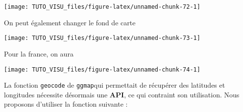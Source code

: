 \documentclass[]{article}
\newenvironment{Shaded}{\begin{snugshade}}{\end{snugshade}}
\newcommand{\DataTypeTok}[1]{\textcolor[rgb]{0.13,0.29,0.53}{#1}}
\newcommand{\DecValTok}[1]{\textcolor[rgb]{0.00,0.00,0.81}{#1}}
\newcommand{\KeywordTok}[1]{\textcolor[rgb]{0.13,0.29,0.53}{\textbf{#1}}}
\newcommand{\NormalTok}[1]{#1}
\newcommand{\OperatorTok}[1]{\textcolor[rgb]{0.81,0.36,0.00}{\textbf{#1}}}
\newcommand{\StringTok}[1]{\textcolor[rgb]{0.31,0.60,0.02}{#1}}
\theoremstyle{definition}
\theoremstyle{definition}
\theoremstyle{definition}
\theoremstyle{remark}
\begin{document}
\begin{center}\texttt{[image: TUTO\_VISU\_files/figure-latex/unnamed-chunk-72-1]} \end{center}

On peut également changer le fond de carte

\begin{Shaded}
\end{Shaded}

\begin{center}\texttt{[image: TUTO\_VISU\_files/figure-latex/unnamed-chunk-73-1]} \end{center}

Pour la france, on aura

\begin{Shaded}
\end{Shaded}

\begin{center}\texttt{[image: TUTO\_VISU\_files/figure-latex/unnamed-chunk-74-1]} \end{center}

La fonction \texttt{geocode} de \texttt{ggmap}qui permettait de récupérer des latitudes et longitudes nécessite désormais une \textbf{API}, ce qui contraint son utilisation. Nous proposons d'utiliser la fonction suivante :
\end{document}
